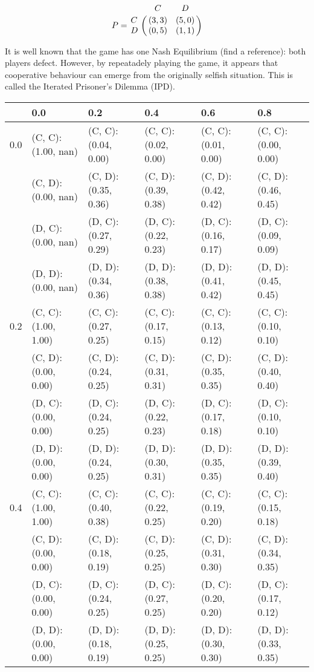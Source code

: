 \begin{equation}\label{eq:payoff_matrix}
% 
P = \bordermatrix{~ & C & D \cr
                  C & (3, 3) & (5, 0) \cr
                  D & (0, 5) & (1, 1) \cr}
% 
\end{equation}

It is well known that the game has one Nash Equilibrium (find a reference): both players defect.
However, by repeatadely playing the game, it appears that cooperative behaviour can emerge from the originally selfish situation.
This is called the Iterated Prisoner's Dilemma (IPD).

\begin{tabular}{ l | l l l l l }
& 0.0 & 0.2 & 0.4 & 0.6 & 0.8 \\ 
\hline 
0.0 & (C, C): (1.00, nan) & (C, C): (0.04, 0.00) & (C, C): (0.02, 0.00) & (C, C): (0.01, 0.00) & (C, C): (0.00, 0.00) \\ 
 & (C, D): (0.00, nan) & (C, D): (0.35, 0.36) & (C, D): (0.39, 0.38) & (C, D): (0.42, 0.42) & (C, D): (0.46, 0.45) \\ 
 & (D, C): (0.00, nan) & (D, C): (0.27, 0.29) & (D, C): (0.22, 0.23) & (D, C): (0.16, 0.17) & (D, C): (0.09, 0.09) \\ 
 & (D, D): (0.00, nan) & (D, D): (0.34, 0.36) & (D, D): (0.38, 0.38) & (D, D): (0.41, 0.42) & (D, D): (0.45, 0.45) \\ 
\hline 
0.2 & (C, C): (1.00, 1.00) & (C, C): (0.27, 0.25) & (C, C): (0.17, 0.15) & (C, C): (0.13, 0.12) & (C, C): (0.10, 0.10) \\ 
 & (C, D): (0.00, 0.00) & (C, D): (0.24, 0.25) & (C, D): (0.31, 0.31) & (C, D): (0.35, 0.35) & (C, D): (0.40, 0.40) \\ 
 & (D, C): (0.00, 0.00) & (D, C): (0.24, 0.25) & (D, C): (0.22, 0.23) & (D, C): (0.17, 0.18) & (D, C): (0.10, 0.10) \\ 
 & (D, D): (0.00, 0.00) & (D, D): (0.24, 0.25) & (D, D): (0.30, 0.31) & (D, D): (0.35, 0.35) & (D, D): (0.39, 0.40) \\ 
\hline 
0.4 & (C, C): (1.00, 1.00) & (C, C): (0.40, 0.38) & (C, C): (0.22, 0.25) & (C, C): (0.19, 0.20) & (C, C): (0.15, 0.18) \\ 
 & (C, D): (0.00, 0.00) & (C, D): (0.18, 0.19) & (C, D): (0.25, 0.25) & (C, D): (0.31, 0.30) & (C, D): (0.34, 0.35) \\ 
 & (D, C): (0.00, 0.00) & (D, C): (0.24, 0.25) & (D, C): (0.27, 0.25) & (D, C): (0.20, 0.20) & (D, C): (0.17, 0.12) \\ 
 & (D, D): (0.00, 0.00) & (D, D): (0.18, 0.19) & (D, D): (0.25, 0.25) & (D, D): (0.30, 0.30) & (D, D): (0.33, 0.35) \\ 

\end{tabular}
